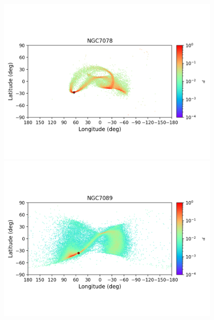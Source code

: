 \begin{figure}
\begin{center}
                \includegraphics[clip=true, trim = 0mm 20mm 0mm 10mm, width=1\columnwidth]{images/error_plots_NGC7078.png}
                \includegraphics[clip=true, trim = 0mm 20mm 0mm 10mm, width=1\columnwidth]{images/error_plots_NGC7089.png}
                

\end{center}
\end{figure}
